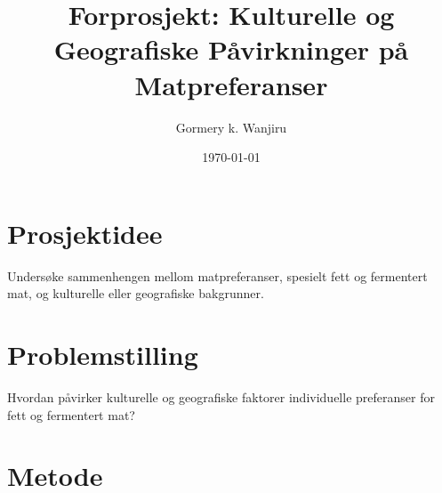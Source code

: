 \documentclass{article}
\begin{document}
\title{Forprosjekt: Kulturelle og Geografiske Påvirkninger på Matpreferanser}
\author{Gormery k. Wanjiru}
\date{\today}

\maketitle

\section*{Prosjektidee}

Undersøke sammenhengen mellom matpreferanser, spesielt fett og fermentert mat, og kulturelle eller geografiske bakgrunner.

\section*{Problemstilling}

Hvordan påvirker kulturelle og geografiske faktorer individuelle preferanser for fett og fermentert mat?

\section*{Metode}
\end{document}
